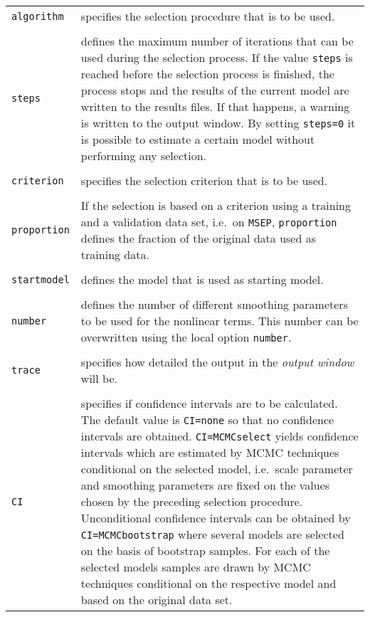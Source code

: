 \begin{longtable}{p{2.2cm} p{13.3cm}}
{\tt algorithm} & specifies the selection procedure that is to be used. \\
            & \\
{\tt steps}     & defines the maximum number of iterations that can be used during the selection process. If the value {\tt steps}
                   is reached before the selection process is finished, the process stops and the results of the current model
                   are written to the results files. If that happens, a warning is written to the output window.
                   By setting {\tt steps=0} it is possible to estimate a certain model
                   without performing any selection. \\
            & \\
{\tt criterion} & specifies the selection criterion that is to be used. \\
            & \\
{\tt proportion} & If the selection is based on a criterion using a training and a validation data set,
                  i.e.~on {\tt MSEP}, {\tt proportion} defines the fraction of the original data used as training data. \\
            & \\
{\tt startmodel} & defines the model that is used as starting model. \\
            & \\
{\tt number} & defines the number of different smoothing parameters to be used for the nonlinear terms. This number can be
overwritten using the local option {\tt number}. \\
            & \\
{\tt trace} & specifies how detailed the output in the {\it output window} will be. \\
            & \\
{\tt CI} & specifies if confidence intervals are to be calculated. The default value is {\tt CI=none}
so that no confidence intervals are obtained. {\tt CI=MCMCselect} yields confidence intervals which are
estimated by MCMC techniques conditional on the selected model, i.e.~scale parameter
and smoothing parameters are fixed on the values chosen by the preceding selection procedure.
Unconditional confidence intervals can be obtained by {\tt CI=MCMCbootstrap} where several models
are selected on the basis of bootstrap samples. For each of the selected models
samples are drawn by MCMC techniques conditional on the respective model and based on the original data set.

\end{longtable}
